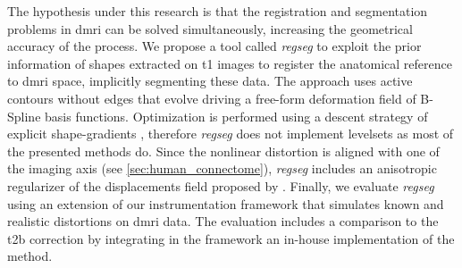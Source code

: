 The hypothesis under this research is that the registration and segmentation
  problems in \gls*{dmri} can be solved simultaneously, increasing the geometrical
  accuracy of the process.
We propose a tool called \emph{regseg} to exploit the prior information of shapes
  extracted on \gls*{t1} images to register the anatomical reference
  to \gls*{dmri} space, implicitly segmenting these data.
The approach uses active contours without edges \citep{chan_active_2001} that evolve driving a
  free-form deformation field of B-Spline basis functions.
Optimization is performed using a descent strategy of explicit shape-gradients
  \citep{besson_dream2s_2003,herbulot_segmentation_2006}, therefore \emph{regseg}
  does not implement levelsets as most of the presented methods do.
Since the nonlinear distortion is aligned with one of the imaging axis (see 
  \autoref{sec:human_connectome}), \emph{regseg} includes an anisotropic regularizer of
  the displacements field proposed by \cite{nagel_investigation_1986}.
Finally, we evaluate \emph{regseg} using an extension of our instrumentation framework
  \citep{esteban_simulationbased_2014} that simulates known and realistic distortions
  on \gls*{dmri} data.
The evaluation includes a comparison to the \gls*{t2b} correction by integrating in the framework
  an in-house implementation of the method.
